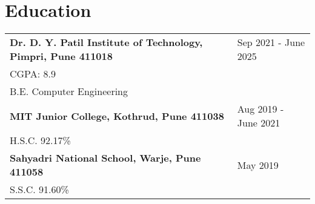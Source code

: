 \documentclass[a4paper,10pt]{article}
\makeatletter
\newenvironment{jobshort}[2]
    {
    \begin{tabularx}{\linewidth}{@{}l X r@{}}
    \textbf{#1} & \hfill &  #2 \\[3.75pt]
    \end{tabularx}
    }
    {
    }
\newenvironment{joblong}[2]
    {
    \begin{tabularx}{\linewidth}{@{}l X r@{}}
    \textbf{#1} & \hfill &  #2 \\[3.75pt]
    \end{tabularx}
    \begin{minipage}[t]{\linewidth}
    \begin{itemize}[nosep,after=\strut, leftmargin=1em, itemsep=3pt,label=--]
    }
    {
    \end{itemize}
    \end{minipage}    
    }
\makeatother
\begin{document}
\section{Education}
\begin{tabularx}{\linewidth}{@{}l X@{}}	

\textbf{Dr. D. Y. Patil Institute of Technology, Pimpri, Pune 411018} & \hfill 
Sep 2021 - June 2025 \\ \vspace*{2mm}
CGPA: 8.9 \\ 
B.E. Computer Engineering \\ 

\textbf{MIT Junior College, Kothrud, Pune 411038} & \hfill 
Aug 2019 - June 2021 \\ \vspace*{2mm}
H.S.C. 92.17\% \\ 

\textbf{Sahyadri National School, Warje, Pune 411058} & \hfill 
May 2019 \\ 
S.S.C. 91.60\% \\

\end{tabularx}




  
\end{document}
